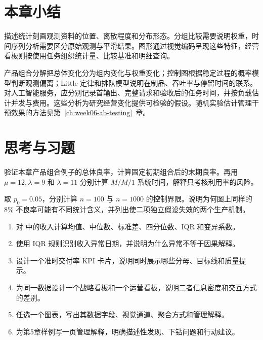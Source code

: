 \section*{本章小结}

描述统计刻画观测资料的位置、离散程度和分布形态。分组比较需要说明权重，时间序列分析需要区分原始观测与平滑结果。图形通过视觉编码呈现这些特征，经营看板则按使用任务组织统计量、比较基准和明细查询。

产品组合分解把总体变化分为组内变化与权重变化；控制图根据稳定过程的概率模型判断观测偏离；Little 定律和排队模型说明在制品、吞吐率与停留时间的联系。对人工智能服务，应分别记录首输出、完整请求和验收后的任务时间，并按负载估计并发与费用。这些分析为研究经营变化提供可检验的假设。随机实验估计管理干预效果的方法见第~\ref{ch:week06-ab-testing}~章。


\section*{思考与习题}

\begin{exercise}[结构与队列]
验证本章产品组合例子的总体良率，计算固定初期组合后的末期良率。再用 \(\mu=12,\lambda=9\) 和 \(\lambda=11\) 分别计算 \(M/M/1\) 系统时间，解释只考核利用率的风险。
\end{exercise}
\begin{exercise}[控制图的边界]
取 \(p_0=0.05\)，分别计算 \(n=100\) 与 \(n=1000\) 的控制界限。说明为何图上同样的 \(8\%\) 不良率可能有不同统计含义，并列出使二项独立假设失效的两个生产机制。
\end{exercise}

\begin{exercise}
\begin{enumerate}
  \item 对  中的收入计算均值、中位数、标准差、四分位数、IQR 和变异系数。
  \item 使用 IQR 规则识别收入异常日期，并说明为什么异常不等于因果解释。
  \item 设计一个准时交付率 KPI 卡片，说明同时展示哪些分母、目标线和质量提示。
  \item 为同一数据设计一个战略看板和一个运营看板，说明二者信息密度和交互方式的差别。
  \item 任选一个图表，写出其数据字段、视觉通道、聚合方式和管理解释。
  \item 为第5章样例写一页管理解释，明确描述性发现、下钻问题和行动建议。
\end{enumerate}
\end{exercise}
